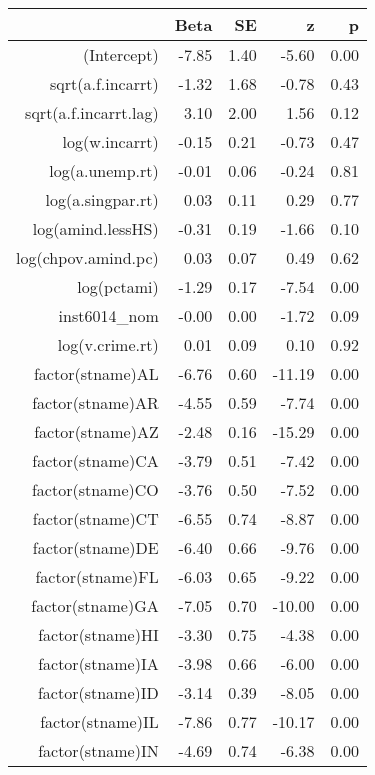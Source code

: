 \begin{table}[ht]
\centering
\begin{tabular}{rrrrr}
  \hline
 & Beta & SE & z & p \\ 
  \hline
(Intercept) & -7.85 & 1.40 & -5.60 & 0.00 \\ 
  sqrt(a.f.incarrt) & -1.32 & 1.68 & -0.78 & 0.43 \\ 
  sqrt(a.f.incarrt.lag) & 3.10 & 2.00 & 1.56 & 0.12 \\ 
  log(w.incarrt) & -0.15 & 0.21 & -0.73 & 0.47 \\ 
  log(a.unemp.rt) & -0.01 & 0.06 & -0.24 & 0.81 \\ 
  log(a.singpar.rt) & 0.03 & 0.11 & 0.29 & 0.77 \\ 
  log(amind.lessHS) & -0.31 & 0.19 & -1.66 & 0.10 \\ 
  log(chpov.amind.pc) & 0.03 & 0.07 & 0.49 & 0.62 \\ 
  log(pctami) & -1.29 & 0.17 & -7.54 & 0.00 \\ 
  inst6014\_nom & -0.00 & 0.00 & -1.72 & 0.09 \\ 
  log(v.crime.rt) & 0.01 & 0.09 & 0.10 & 0.92 \\ 
  factor(stname)AL & -6.76 & 0.60 & -11.19 & 0.00 \\ 
  factor(stname)AR & -4.55 & 0.59 & -7.74 & 0.00 \\ 
  factor(stname)AZ & -2.48 & 0.16 & -15.29 & 0.00 \\ 
  factor(stname)CA & -3.79 & 0.51 & -7.42 & 0.00 \\ 
  factor(stname)CO & -3.76 & 0.50 & -7.52 & 0.00 \\ 
  factor(stname)CT & -6.55 & 0.74 & -8.87 & 0.00 \\ 
  factor(stname)DE & -6.40 & 0.66 & -9.76 & 0.00 \\ 
  factor(stname)FL & -6.03 & 0.65 & -9.22 & 0.00 \\ 
  factor(stname)GA & -7.05 & 0.70 & -10.00 & 0.00 \\ 
  factor(stname)HI & -3.30 & 0.75 & -4.38 & 0.00 \\ 
  factor(stname)IA & -3.98 & 0.66 & -6.00 & 0.00 \\ 
  factor(stname)ID & -3.14 & 0.39 & -8.05 & 0.00 \\ 
  factor(stname)IL & -7.86 & 0.77 & -10.17 & 0.00 \\ 
  factor(stname)IN & -4.69 & 0.74 & -6.38 & 0.00 \\ 

\end{tabular}
\end{table}
